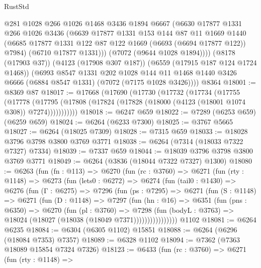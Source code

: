 \begin{lexlean}{RustStd}
\begin{coremodule}
          @281
          @1028
          @266
          @1026
          @1468
          @3436
          @1894
          @6667
          (@6630
            @17877
            @1331
            @266
            @1026
            @3436
            (@6639
              @17877
              @1331
              @153
              @144
              @87
              @11
              @1669
              @1440
              (@6685 @17877 @1331 @122 @87 @122 @1669 (@6693 (@6694 @17877 @122)) @7984)
              (@6710 @17877 @1331)))
          (@7072 (@9644 @1028 @1894))))
      (@8178 (@17903 @37))
      (@4123 (@17908 @307 @187))
      (@6559 (@17915 @187 @124 @1724 @1468))
      (@6993
        @8547
        @1331
        @202
        @1028
        @144
        @11
        @1468
        @1440
        @3426
        @6666
        (@6884 @8547 @1331)
        (@7072 (@7175 @1028 @3426))))
    @8364
@18001 := @8369 @87
@18017 := @17668
    (@17690
      (@17730
        (@17732
          (@17734
            (@17755
              (@17778
                (@17795 (@17808 (@17824 (@17828 (@18000 (@4123 (@18001 @1074 @308)) @7274)))))))))))
@18018 := @6247 @659
@18022 := @7289 (@6253 @659) (@6259 @659)
@18024 := @6264 (@6233 @7300)
@18025 := @3767 @5665
@18027 := @6264 (@18025 @7309)
@18028 := @7315 @659
@18033 := @18028 @3796 @3798 @3800 @3769 @3771
@18038 := @6264 (@7314 (@18033 @7322 @7327) @7334)
@18039 := @7337 @659
@18044 := @18039 @3796 @3798 @3800 @3769 @3771
@18049 := @6264 (@3836 (@18044 @7322 @7327) @1300)
@18080 := @6263
    (fun (fn : @113) =>
    @6270
      (fun (rc : @3760) =>
      @6271
        (fun (rty : @1148) =>
        @6273
          (fun (lets0 : @6272) =>
          @6274
            (fun (tail0 : @1430) =>
            @6276
              (fun (Γ : @6275) =>
              @7296
                (fun (ps : @7295) =>
                @6271
                  (fun (S : @1148) =>
                  @6271
                    (fun (D : @1148) =>
                    @7297
                      (fun (hn : @16) =>
                      @6351
                        (fun (pns : @6350) =>
                        @6270
                          (fun (pl : @3760) =>
                          @7298
                            (fun (bodyL : @3763) =>
                            @18024 (@18027 (@18038 (@18049 @7371))))))))))))))))
    @1102
@18081 := @6264 @6235
@18084 := @6304 (@6305 @1102) @15851
@18088 := @6264 (@6296 (@18084 @7353) @7357)
@18089 := @6328 @1102
@18094 := @7362 (@7363 @18089 @15854 @7324 @7326)
@18123 := @6433
    (fun (rc : @3760) =>
    @6271
      (fun (rty : @1148) =>

\end{coremodule}
\end{lexlean}
